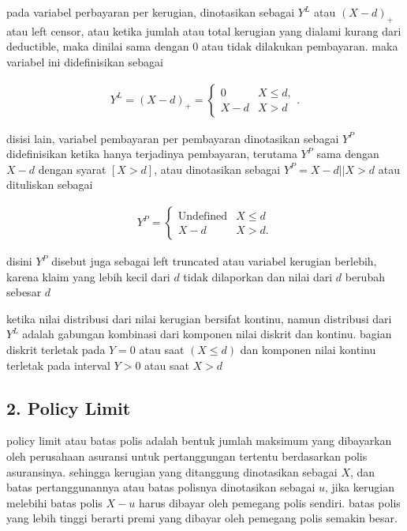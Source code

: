 \documentclass[
]{book}
\begin{document}
pada variabel perbayaran per kerugian, dinotasikan sebagai \(Y^L\) atau \((X-d)_+\) atau left censor, atau ketika jumlah atau total kerugian yang dialami kurang dari deductible, maka dinilai sama dengan 0 atau tidak dilakukan pembayaran. maka variabel ini didefinisikan sebagai

\begin{align*}
Y^{L} = \left( X - d \right)_{+} 
= \left\{ \begin{array}{cc}
0 & X \le d, \\
X - d & X > d  
\end{array} \right. .
\end{align*}

disisi lain, variabel pembayaran per pembayaran dinotasikan sebagai \(Y^P\) didefinisikan ketika hanya terjadinya pembayaran, terutama \(Y^P\) sama dengan \(X-d\) dengan syarat \([X>d]\), atau dinotasikan sebagai \(Y^P=X-d||X>d\) atau dituliskan sebagai

\begin{align*}
Y^{P} = \left\{ \begin{matrix}
\text{Undefined} & X \le d \\
X - d & X > d .
\end{matrix}  \right.
\end{align*}

disini \(Y^P\) disebut juga sebagai left truncated atau variabel kerugian berlebih, karena klaim yang lebih kecil dari \(d\) tidak dilaporkan dan nilai dari \(d\) berubah sebesar \(d\)

ketika nilai distribusi dari nilai kerugian bersifat kontinu, namun distribusi dari \(Y^L\) adalah gabungan kombinasi dari komponen nilai diskrit dan kontinu. bagian diskrit terletak pada \(Y=0\) atau saat \((X \leq d)\) dan komponen nilai kontinu terletak pada interval \(Y>0\) atau saat \(X>d\)

\hypertarget{policy-limit}{%
\subsection{2. Policy Limit}\label{policy-limit}}

policy limit atau batas polis adalah bentuk jumlah maksimum yang dibayarkan oleh perusahaan asuransi untuk pertanggungan tertentu berdasarkan polis asuransinya. sehingga kerugian yang ditanggung dinotasikan sebagai \(X\), dan batas pertanggunannya atau batas polisnya dinotasikan sebagai \(u\), jika kerugian melebihi batas polis \(X-u\) harus dibayar oleh pemegang polis sendiri. batas polis yang lebih tinggi berarti premi yang dibayar oleh pemegang polis semakin besar.
\end{document}
